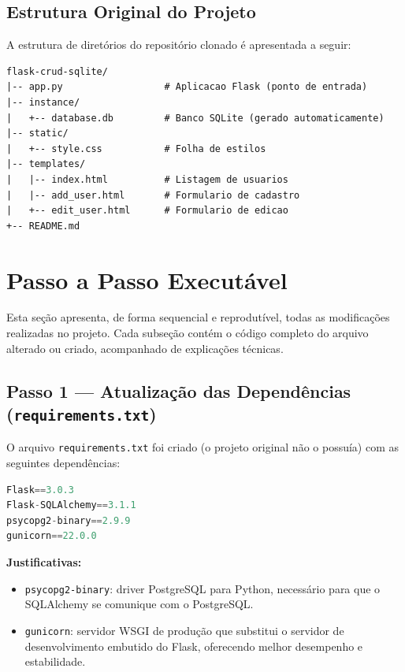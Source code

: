 \documentclass[12pt,a4paper]{article}
\begin{document}
\subsection{Estrutura Original do Projeto}

A estrutura de diretórios do repositório clonado é apresentada a seguir:

\begin{lstlisting}[caption={Árvore de diretórios do projeto original.}]
flask-crud-sqlite/
|-- app.py                  # Aplicacao Flask (ponto de entrada)
|-- instance/
|   +-- database.db         # Banco SQLite (gerado automaticamente)
|-- static/
|   +-- style.css           # Folha de estilos
|-- templates/
|   |-- index.html          # Listagem de usuarios
|   |-- add_user.html       # Formulario de cadastro
|   +-- edit_user.html      # Formulario de edicao
+-- README.md
\end{lstlisting}

\section{Passo a Passo Executável}
\label{sec:passo-a-passo}

Esta seção apresenta, de forma sequencial e reprodutível, todas as modificações
realizadas no projeto. Cada subseção contém o código completo do arquivo alterado
ou criado, acompanhado de explicações técnicas.

\subsection{Passo 1 — Atualização das Dependências (\texttt{requirements.txt})}

O arquivo \texttt{requirements.txt} foi criado (o projeto original não o possuía)
com as seguintes dependências:

\begin{lstlisting}[language=Python, caption={\texttt{requirements.txt} — dependências do projeto refatorado.}]
Flask==3.0.3
Flask-SQLAlchemy==3.1.1
psycopg2-binary==2.9.9
gunicorn==22.0.0
\end{lstlisting}

\textbf{Justificativas:}
\begin{itemize}[nosep]
  \item \texttt{psycopg2-binary}: driver PostgreSQL para Python, necessário para que
        o SQLAlchemy se comunique com o PostgreSQL.
  \item \texttt{gunicorn}: servidor WSGI de produção que substitui o servidor de
        desenvolvimento embutido do Flask, oferecendo melhor desempenho e
        estabilidade.
\end{itemize}
\end{document}

